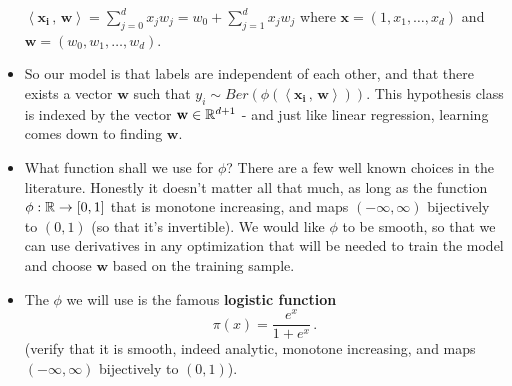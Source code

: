 \documentclass[11pt]{article}
\newcommand{\innerr}[2]{{\left\langle #1\,,\,#2 \right\rangle}}
\newcommand{\VV}[1]{\mathbf{#1}}
\begin{document}
\begin{itemize}
	$\innerr{\VV{x_i}}{\VV{w}} = \sum_{j=0}^d x_j w_j = w_0 +\sum_{j=1}^d x_j
	w_j$ where $\VV{x}=(1,x_1,\ldots,x_d)$ and $\VV{w}=(w_0,w_1,\ldots,w_d)$.
    \item So our model is that labels are independent of each other, and that
      there exists a vector $\VV{w}$ such that  $y_i \sim Ber(\phi
      (\innerr{\VV{x_i}}{\VV{w}} ))$.
      This hypothesis class is indexed by the vector $\VV{w}\in\reals^{d+1}$ - and just like
      linear regression, learning comes down to finding $\VV{w}$. 
    \item What function shall we use for $\phi$? There are a few well known choices in the
      literature. Honestly it doesn't matter all that much, as long as the
      function $\phi:\mathbb{R}\to[0,1]$ that is monotone increasing, and maps
      $(-\infty,\infty)$ bijectively to $(0,1)$ (so that it's invertible). 
      We would like $\phi$ to be smooth, so that we can use derivatives in
      any optimization that will be needed to train the model and choose $\VV{w}$
      based on the training sample. 
    \item The $\phi$ we will use is the famous {\bf logistic function}
      \[\pi(x) = \frac{e^x}{1+e^x}\,.\] (verify that it is smooth, indeed
	analytic,  monotone increasing, and maps
      $(-\infty,\infty)$ bijectively to $(0,1)$). 
  \end{itemize}
\end{document}
